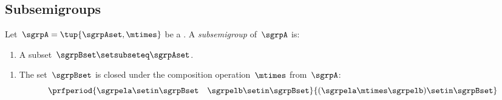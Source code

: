 
\subsection{Subsemigroups}


\begin{definition}[Subsemigroup]\label{def:subsemigroup}
    Let~$\sgrpA = \tup{\sgrpAset, \mtimes}$ be a .
    A \emph{subsemigroup} of~$\sgrpA$ is:

    \constit

    \begin{enumerate}
        \item A subset~$\sgrpBset \setsubseteq \sgrpAset$.
    \end{enumerate}

    \condit

    \begin{enumerate}
        \item The set~$\sgrpBset$ is closed under the composition operation~$\mtimes$ from~$\sgrpA$:
              \begin{equation}
                  \prfperiod{
                      \sgrpela \setin \sgrpBset \quad \sgrpelb \setin \sgrpBset
                  }{
                      (\sgrpela \mtimes \sgrpelb) \setin \sgrpBset
                  }
              \end{equation}
    \end{enumerate}
\end{definition}

